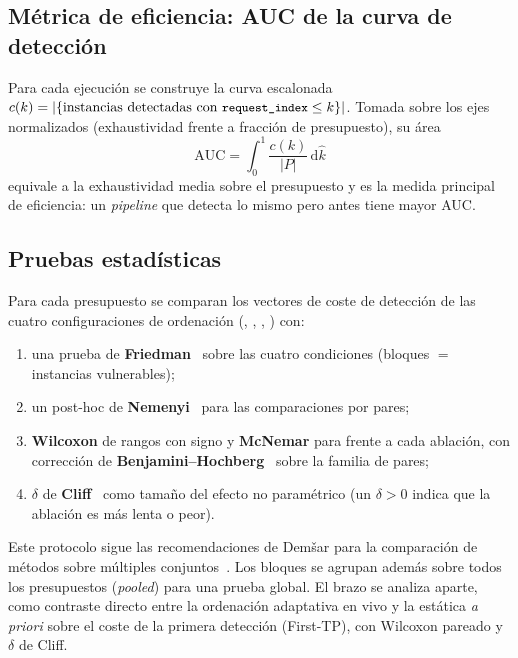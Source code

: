 \subsection{Métrica de eficiencia: AUC de la curva de detección}
\label{sec:auc}

Para cada ejecución se construye la curva escalonada
$c(k) = \lvert \{\text{instancias detectadas con } \texttt{\small request\_index} \le k\} \rvert$.
Tomada sobre los ejes normalizados (exhaustividad frente a fracción de
presupuesto), su área
\begin{equation}
  \mathrm{AUC} = \int_0^1 \frac{c(k)}{\lvert P \rvert}\, \mathrm{d}\hat{k}
  \label{eq:auc}
\end{equation}
equivale a la exhaustividad media sobre el presupuesto y es la medida principal
de eficiencia: un \emph{pipeline} que detecta lo mismo pero antes tiene mayor
AUC.

\subsection{Pruebas estadísticas}
\label{sec:tests}

Para cada presupuesto se comparan los vectores de coste de detección de las
cuatro configuraciones de ordenación (, ,
, ) con:
\begin{enumerate}
  \item una prueba de \textbf{Friedman}~\cite{friedman1937use} sobre las cuatro
  condiciones (bloques $=$ instancias vulnerables);
  \item un post-hoc de \textbf{Nemenyi}~\cite{nemenyi1963distribution} para las
  comparaciones por pares;
  \item \textbf{Wilcoxon} de rangos con signo y \textbf{McNemar} para
   frente a cada ablación, con corrección de
  \textbf{Benjamini--Hochberg}~\cite{benjamini1995controlling} sobre la familia
  de pares;
  \item $\delta$ de \textbf{Cliff}~\cite{cliff1993dominance} como tamaño del
  efecto no paramétrico (un $\delta > 0$ indica que la ablación es más lenta o
  peor).
\end{enumerate}
Este protocolo sigue las recomendaciones de Dem\v{s}ar para la comparación de
métodos sobre múltiples conjuntos~\cite{demsar2006statistical}. Los bloques se
agrupan además sobre todos los presupuestos (\emph{pooled}) para una prueba
global. El brazo  se analiza aparte, como contraste
directo entre la ordenación adaptativa en vivo y la estática \emph{a priori}
sobre el coste de la primera detección (First-TP), con Wilcoxon pareado y
$\delta$ de Cliff.

